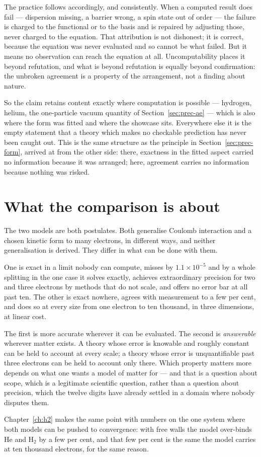 The practice follows accordingly, and consistently. When a computed result does fail --- dispersion
missing, a barrier wrong, a spin state out of order --- the failure is charged to the functional or
to the basis and is repaired by adjusting those, never charged to the equation. That attribution is
not dishonest; it is correct, because the equation was never evaluated and so cannot be what failed.
But it means no observation can reach the equation at all. Uncomputability places it beyond
refutation, and what is beyond refutation is equally beyond confirmation: the unbroken agreement is
a property of the arrangement, not a finding about nature.

So the claim retains content exactly where computation is possible --- hydrogen, helium, the
one-particle vacuum quantity of Section~\ref{sec:prec-ae} --- which is also where the form was fitted
and where the showcase sits. Everywhere else it is the empty statement that a theory which makes no
checkable prediction has never been caught out. This is the same structure as the principle in
Section~\ref{sec:prec-form}, arrived at from the other side: there, exactness in the fitted aspect
carried no information because it was arranged; here, agreement carries no information because
nothing was risked.


\section{What the comparison is about}\label{sec:prec-conclusion}

The two models are both postulates. Both generalise Coulomb interaction and a chosen kinetic form
to many electrons, in different ways, and neither generalisation is derived. They differ in what
can be done with them.

One is exact in a limit nobody can compute, misses by $1.1\times10^{-5}$ and by a whole splitting
in the one case it solves exactly, achieves extraordinary precision for two and three electrons by
methods that do not scale, and offers no error bar at all past ten. The other is exact nowhere,
agrees with measurement to a few per cent, and does so at every size from one electron to ten
thousand, in three dimensions, at linear cost.

The first is more accurate wherever it can be evaluated. The second is \emph{answerable} wherever
matter exists. A theory whose error is knowable and roughly constant can be held to account at
every scale; a theory whose error is unquantifiable past three electrons can be held to account
only there. Which property matters more depends on what one wants a model of matter for --- and
that is a question about scope, which is a legitimate scientific question, rather than a question
about precision, which the twelve digits have already settled in a domain where nobody disputes
them.

Chapter~\ref{ch:h2} makes the same point with numbers on the one system where both models can be
pushed to convergence: with free walls the model over-binds He and H$_2$ by a few per cent, and that
few per cent is the same the model carries at ten thousand electrons, for the same reason.

